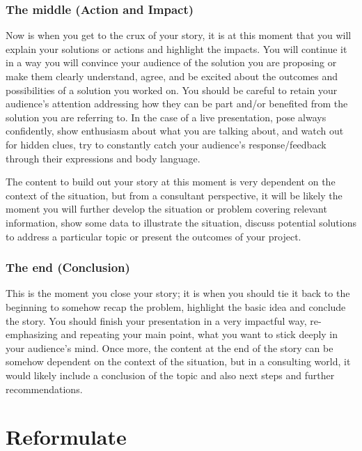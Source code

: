 \documentclass[
]{book}
\begin{document}
\hypertarget{the-middle-action-and-impact}{%
\subsubsection{The middle (Action and Impact)}\label{the-middle-action-and-impact}}

Now is when you get to the crux of your story, it is at this moment that you will explain your solutions or actions and highlight the impacts. You will continue it in a way you will convince your audience of the solution you are proposing or make them clearly understand, agree, and be excited about the outcomes and possibilities of a solution you worked on. You should be careful to retain your audience's attention addressing how they can be part and/or benefited from the solution you are referring to. In the case of a live presentation, pose always confidently, show enthusiasm about what you are talking about, and watch out for hidden clues, try to constantly catch your audience's response/feedback through their expressions and body language.

The content to build out your story at this moment is very dependent on the context of the situation, but from a consultant perspective, it will be likely the moment you will further develop the situation or problem covering relevant information, show some data to illustrate the situation, discuss potential solutions to address a particular topic or present the outcomes of your project.

\hypertarget{the-end-conclusion}{%
\subsubsection{The end (Conclusion)}\label{the-end-conclusion}}

This is the moment you close your story; it is when you should tie it back to the beginning to somehow recap the problem, highlight the basic idea and conclude the story. You should finish your presentation in a very impactful way, re-emphasizing and repeating your main point, what you want to stick deeply in your audience's mind. Once more, the content at the end of the story can be somehow dependent on the context of the situation, but in a consulting world, it would likely include a conclusion of the topic and also next steps and further recommendations.

\hypertarget{reformulate2}{%
\section{Reformulate}\label{reformulate2}}
\end{document}
